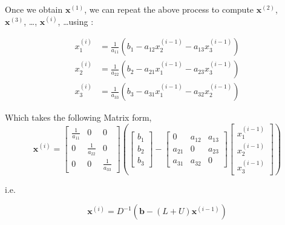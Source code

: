 \documentclass[main]{subfiles}
\begin{document}
    Once we obtain $\textbf{x}^{(1)}$, we can repeat the above process to compute $\textbf{x}^{(2)}$, 
    \\$\textbf{x}^{(3)}$, \ldots, $\textbf{x}^{(i)}$, \ldots using :

    \begin{align*}
        x_1^{(i)}  &= \frac{1}{a_{11}}(b_1 - a_{12}x_2^{(i-1)} - a_{13}x_3^{(i-1)}) \\
        x_2^{(i)}  &= \frac{1}{a_{22}}(b_2 - a_{21}x_1^{(i-1)} - a_{23}x_3^{(i-1)})  \\
        x_3^{(i)}  &= \frac{1}{a_{33}}(b_3 - a_{31}x_1^{(i-1)} - a_{32}x_2^{(i-1)}) 
    \end{align*}

    Which takes the following Matrix form,
    \\

    \begin{equation*}
    \textbf{x}^{(i)} = \begin{bmatrix}
         \frac{1}{a_{11}} &     0            &      0           \\
            0             & \frac{1}{a_{22}} &      0            \\
            0             &     0            & \frac{1}{a_{33}}       
    \end{bmatrix} \left(
    \begin{bmatrix}
        b_{1}  \\
        b_{2}  \\
        b_{3} 
    \end{bmatrix} - 
    \begin{bmatrix}
            0      &     a_{12} &      a_{13}           \\
            a_{21} &     0      &      a_{23}            \\
            a_{31} &     a_{32} &       0       
    \end{bmatrix}
    \begin{bmatrix}
        x_{1}^{(i-1)}  \\
        x_{2}^{(i-1)}  \\
        x_{3}^{(i-1)} 
    \end{bmatrix} \right)    
    \end{equation*}

    \vspace{2mm}
    i.e.

    \[
        \textbf{x}^{(i)} = D^{-1}(\textbf{b} - (L+U) \textbf{x}^{(i-1)})
    \]

\clearpage
\end{document}

